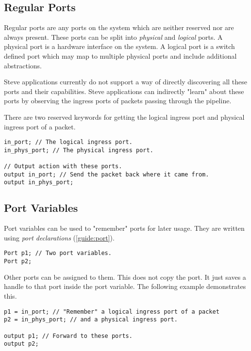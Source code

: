 \subsection{Regular Ports} \label{tut:regular_ports}

Regular ports are any ports on the system which are neither reserved nor are
always present. These ports can be split into \textit{physical} and
\textit{logical} ports. A physical port is a hardware interface on the system. A
logical port is a switch defined port which may map to multiple physical ports
and include additional abstractions.

Steve applications currently do not support a way of directly discovering all
these ports and their capabilities. Steve applications can indirectly "learn"
about these ports by observing the ingress ports of packets passing
through the pipeline.

There are two reserved keywords for getting the logical ingress port and physical ingress port of a packet.

\begin{codepage}
\begin{lstlisting}
in_port; // The logical ingress port.
in_phys_port; // The physical ingress port.

// Output action with these ports.
output in_port; // Send the packet back where it came from.
output in_phys_port;
\end{lstlisting}
\end{codepage}

\subsection{Port Variables} \label{tut:declared_ports}

Port variables can be used to "remember" ports for later usage. They are
written using \textit{port declarations} (\ref{guide:port}).

\begin{codepage}
\begin{lstlisting}
Port p1; // Two port variables.
Port p2;
\end{lstlisting}
\end{codepage}

Other ports can be assigned to them. This does not copy the port. It just saves
a handle to that port inside the port variable. The following example demonstrates this.

\begin{codepage}
\begin{lstlisting}
p1 = in_port; // "Remember" a logical ingress port of a packet
p2 = in_phys_port; // and a physical ingress port.

output p1; // Forward to these ports.
output p2;
\end{lstlisting}
\end{codepage}


